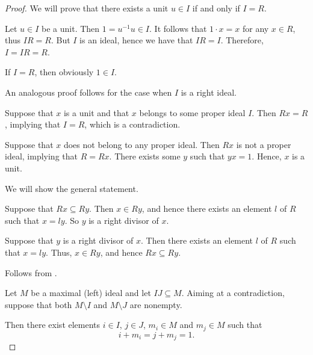 \begin{proof}
   We will prove that there exists a unit \( u \in I \) if and only if \( I = R \).

  \SufficiencySubProof* Let \( u \in I \) be a unit. Then \( 1 = u^{-1} u \in I \). It follows that \( 1 \cdot x = x \) for any \( x \in R \), thus \( IR = R \). But \( I \) is an ideal, hence we have that \( IR = I \). Therefore, \( I = IR = R \).

  \NecessitySubProof* If \( I = R \), then obviously \( 1 \in I \).

  An analogous proof follows for the case when \( I \) is a right ideal.


  \SufficiencySubProof* Suppose that \( x \) is a unit and that \( x \) belongs to some proper ideal \( I \). Then \( Rx = R \), implying that \( I = R \), which is a contradiction.

  \NecessitySubProof* Suppose that \( x \) does not belong to any proper ideal. Then \( Rx \) is not a proper ideal, implying that \( R = Rx \). There exists some \( y \) such that \( yx = 1 \). Hence, \( x \) is a unit.

   We will show the general statement.

  \SufficiencySubProof* Suppose that \( Rx \subseteq Ry \). Then \( x \in Ry \), and hence there exists an element \( l \) of \( R \) such that \( x = ly \). So \( y \) is a right divisor of \( x \).

  \NecessitySubProof* Suppose that \( y \) is a right divisor of \( x \). Then there exists an element \( l \) of \( R \) such that \( x = ly \). Thus, \( x \in Ry \), and hence \( Rx \subseteq Ry \).

   Follows from .

   Let \( M \) be a maximal (left) ideal and let \( IJ \subseteq M \). Aiming at a contradiction, suppose that both \( M \setminus I \) and \( M \setminus J \) are nonempty.

  Then there exist elements \( i \in I \), \( j \in J \), \( m_i \in M \) and \( m_j \in M \) such that
  \begin{equation*}
    i + m_i = j + m_j = 1.
  \end{equation*}


\end{proof}
